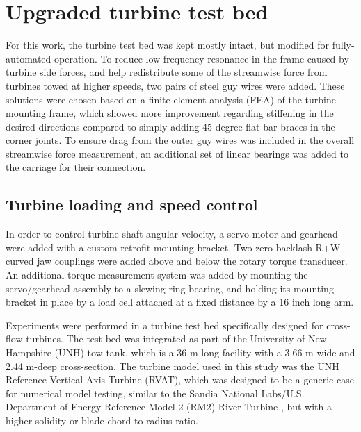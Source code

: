 

\section{Upgraded turbine test bed}

For this work, the turbine test bed was kept mostly intact, but modified for
fully-automated operation. To reduce low frequency resonance in the frame caused
by turbine side forces, and help redistribute some of the streamwise force from
turbines towed at higher speeds, two pairs of steel guy wires were added. These
solutions were chosen based on a finite element analysis (FEA) of the turbine
mounting frame, which showed more improvement regarding stiffening in the
desired directions compared to simply adding 45 degree flat bar braces in the
corner joints. To ensure drag from the outer guy wires was included in the
overall streamwise force measurement, an additional set of linear bearings was
added to the carriage for their connection.


\subsection{Turbine loading and speed control}

In order to control turbine shaft angular velocity, a servo motor and gearhead were added with a custom retrofit mounting bracket.
Two zero-backlash R+W curved jaw couplings were added above and below the rotary torque transducer.
An additional torque measurement system was added by mounting the servo/gearhead assembly to a slewing ring bearing, and holding its mounting bracket in place by a load cell attached at a fixed distance by a 16 inch long arm. 



Experiments were performed in a turbine test bed specifically designed for
cross-flow turbines. The test bed was integrated as part of the University of
New Hampshire (UNH) tow tank, which is a 36 m-long facility with a 3.66 m-wide
and 2.44 m-deep cross-section. The turbine model used in this study was the UNH
Reference Vertical Axis Turbine (RVAT), which was designed to be a generic case
for numerical model testing, similar to the Sandia National Labs/U.S. Department
of Energy Reference Model 2 (RM2) River Turbine \cite{Neary2014}, but with a
higher solidity or blade chord-to-radius ratio.

